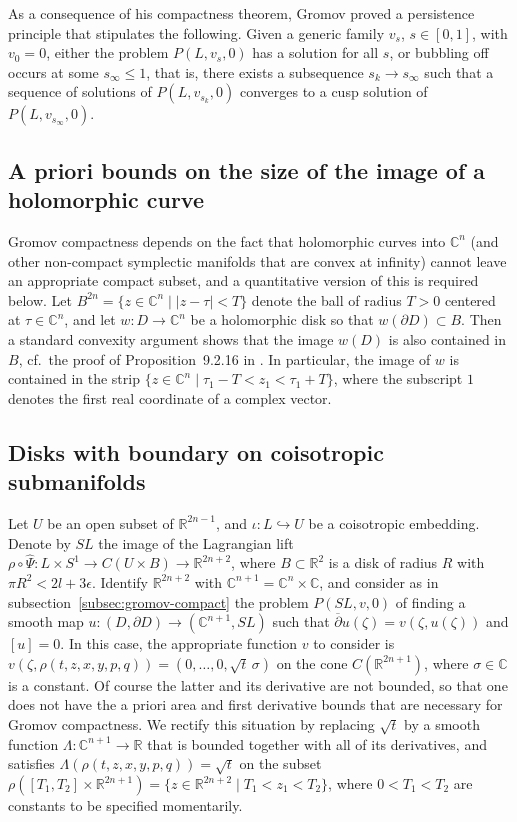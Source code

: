 \documentclass{amsart}
\theoremstyle{remark}
\def\C{{\mathbb C}}
\def\p{{\partial}}
\def\pbar{{\overline{\partial}}}
\def\R{{\mathbb R}}
\begin{document}
As a consequence of his compactness theorem, Gromov proved a persistence principle that stipulates the following.
Given a generic family $v_s$, $s \in [0, 1]$, with $v_0 = 0$, either the problem $P (L, v_s, 0)$ has a solution for all $s$, or bubbling off occurs at some $s_\infty \le 1$, that is, there exists a subsequence $s_k \to s_\infty$ such that a sequence of solutions of $P (L, v_{s_k}, 0)$ converges to a cusp solution of $P (L, v_{s_\infty}, 0)$.

\subsection{A priori bounds on the size of the image of a holomorphic curve}
Gromov compactness depends on the fact that holomorphic curves into $\C^n$ (and other non-compact symplectic manifolds that are convex at infinity) cannot leave an appropriate compact subset, and a quantitative version of this is required below.
Let $B^{2 n} = \{ z \in \C^n \mid | z - \tau | < T \}$ denote the ball of radius $T > 0$ centered at $\tau \in \C^n$, and let $w \colon D \to \C^n$ be a holomorphic disk so that $w (\p D) \subset B$.
Then a standard convexity argument shows that the image $w (D)$ is also contained in $B$, cf.\ the proof of Proposition~9.2.16 in \cite{mcduff:hcs04}.
In particular, the image of $w$ is contained in the strip $\{ z \in \C^n \mid \tau_1 - T < z_1 < \tau_1 + T \}$, where the subscript $1$ denotes the first real coordinate of a complex vector.

\subsection{Disks with boundary on coisotropic submanifolds} \label{subsec:disks}
Let $U$ be an open subset of $\R^{2 n - 1}$, and $\iota \colon L \hookrightarrow U$ be a coisotropic embedding.
Denote by $SL$ the image of the Lagrangian lift $\rho \circ \widehat{\Psi} \colon L \times S^1 \to C (U \times B) \to \R^{2 n + 2}$, where $B \subset \R^2$ is a disk of radius $R$ with $\pi R^2 < 2 l + 3 \epsilon$.
Identify $\R^{2 n + 2}$ with $\C^{n + 1} = \C^n \times \C$, and consider as in subsection~\ref{subsec:gromov-compact} the problem $P (SL, v, 0)$ of finding a smooth map $u \colon (D, \p D) \to (\C^{n + 1}, SL)$ such that $\pbar u (\zeta) = v (\zeta, u (\zeta))$ and $[ u ] = 0$.
In this case, the appropriate function $v$ to consider is $v (\zeta, \rho (t, z, x, y, p, q)) = (0, \ldots, 0, \sqrt{t} \, \sigma)$ on the cone $C (\R^{2 n + 1})$, where $\sigma \in \C$ is a constant.
Of course the latter and its derivative are not bounded, so that one does not have the a priori area and first derivative bounds that are necessary for Gromov compactness.
We rectify this situation by replacing $\sqrt{t}$ by a smooth function $\Lambda \colon \C^{n + 1} \to \R$ that is bounded together with all of its derivatives, and satisfies $\Lambda (\rho (t, z, x, y, p, q)) = \sqrt{t}$ on the subset $\rho ([T_1, T_2] \times \R^{2 n + 1}) = \{ z \in \R^{2 n + 2} \mid T_1 < z_1 < T_2 \}$, where $0 < T_1 < T_2$ are constants to be specified momentarily.
\end{document}
